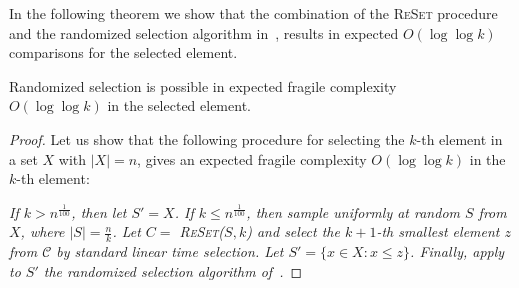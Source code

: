In the following theorem we show that the combination of the \textsc{ReSet} procedure and the randomized selection algorithm in~\cite{afshani:fragile-ESA19}, results in expected $O(\log \log k)$ comparisons for the selected element. %

\begin{theorem}
Randomized selection is possible in expected fragile complexity\\ $O(\log \log k)$ in the selected element.
\end{theorem}
\begin{proof}
Let us show that the following procedure for selecting the $k$-th element in a set $X$ with $|X|=n$, gives an expected fragile complexity $O(\log \log k)$ in the $k$-th element:

\emph{If $k > n^{\frac{1}{100}}$, then let $S'=X$. If $k \leq n^{\frac{1}{100}}$, then sample uniformly at random $S$ from $X$, where $|S|=\frac{n}{k}$. Let $C=$ \textsc{ReSet}($S, k$) and select the $k+1$-th smallest element $z$ from $\mathcal{C}$ by standard linear time selection. Let $S'=\{x \in X: x\leq z\}$. Finally, apply to $S'$ the randomized selection algorithm of~\cite{afshani:fragile-ESA19}.}


\end{proof}
